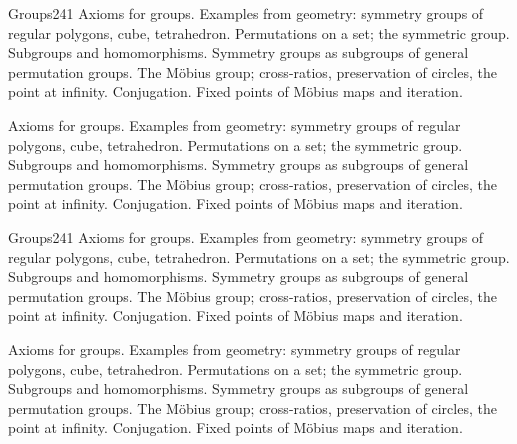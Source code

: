 \begin{studymodule}{Groups}{24}{1}
  {Axioms for groups. Examples from geometry: symmetry groups of regular polygons, cube, tetrahedron. Permutations on a set; the symmetric group. Subgroups and homomorphisms. Symmetry groups as subgroups of general permutation groups. The Möbius group; cross-ratios, preservation of circles, the point at infinity. Conjugation. Fixed points of Möbius maps and iteration.}

  {Axioms for groups. Examples from geometry: symmetry groups of regular polygons, cube, tetrahedron. Permutations on a set; the symmetric group. Subgroups and homomorphisms. Symmetry groups as subgroups of general permutation groups. The Möbius group; cross-ratios, preservation of circles, the point at infinity. Conjugation. Fixed points of Möbius maps and iteration.}

\booksection
\end{studymodule}

\begin{studymodule}{Groups}{24}{1}
  {Axioms for groups. Examples from geometry: symmetry groups of regular polygons, cube, tetrahedron. Permutations on a set; the symmetric group. Subgroups and homomorphisms. Symmetry groups as subgroups of general permutation groups. The Möbius group; cross-ratios, preservation of circles, the point at infinity. Conjugation. Fixed points of Möbius maps and iteration.}

  {Axioms for groups. Examples from geometry: symmetry groups of regular polygons, cube, tetrahedron. Permutations on a set; the symmetric group. Subgroups and homomorphisms. Symmetry groups as subgroups of general permutation groups. The Möbius group; cross-ratios, preservation of circles, the point at infinity. Conjugation. Fixed points of Möbius maps and iteration.}

\booksection
\end{studymodule}